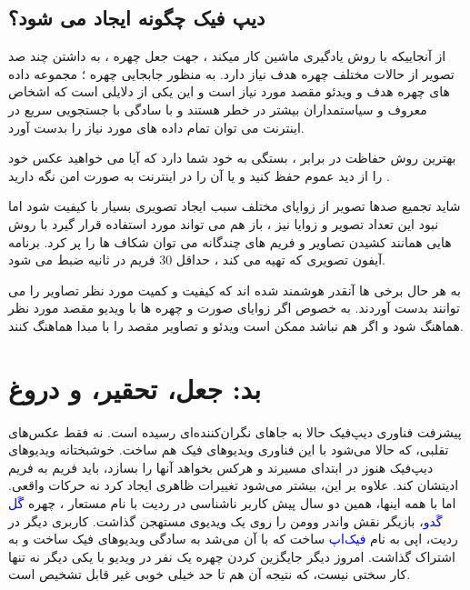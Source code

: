 \documentclass[12pt,a4paper]{report}
\begin{document}
\section{دیپ فیک  چگونه ایجاد می شود؟}
از آنجاییکه  با روش یادگیری ماشین کار میکند ، جهت جعل چهره ،  به داشتن چند صد تصویر از حالات مختلف چهره هدف نیاز دارد. به منظور جابجایی چهره ؛ مجموعه داده های چهره هدف و ویدئو مقصد مورد نیاز است و این یکی از دلایلی است که اشخاص معروف و سیاستمداران بیشتر در خطر هستند و با سادگی با جستجویی سریع در اینترنت می توان تمام داده های مورد نیاز را بدست آورد.

بهترین روش حفاظت در برابر  ، بستگی به خود شما دارد که آیا می خواهید عکس خود را از دید عموم حفظ کنید و یا آن را در اینترنت به صورت امن نگه دارید .

شاید تجمیع صدها تصویر از زوایای مختلف سبب ایجاد تصویری بسیار با کیفیت شود اما نبود این تعداد تصویر و زوایا نیز ، باز هم می تواند مورد استفاده   قرار گیرد با روش هایی همانند کشیدن تصاویر و فریم های چندگانه می توان شکاف ها را پر کرد. برنامه  آیفون تصویری که تهیه می کند ، حداقل 30 فریم در ثانیه ضبط می شود.

به هر حال برخی  ها آنقدر هوشمند شده اند که کیفیت و کمیت مورد نظر تصاویر را می توانند بدست آوردند. به خصوص اگر زوایای صورت و چهره ها با ویدیو مقصد مورد نظر هماهنگ شود و اگر هم نباشد ممکن است ویدئو و تصاویر مقصد را با مبدا هماهنگ کنند.
	
\chapter{بد: جعل، تحقیر، و دروغ}\label{فصل دوم}
 	
 	پیشرفت فناوری دیپ‌فیک حالا به جاهای نگران‌کننده‌ای رسیده است. نه فقط عکس‌های تقلبی، که حالا می‌شود با این فناوری ویدیوهای فیک هم ساخت. خوشبختانه ویدیوهای دیپ‌فیک هنوز در ابتدای مسیرند و هرکس بخواهد آنها را بسازد، باید فریم به فریم ادیتشان کند. علاوه بر این، بیشتر می‌شود تغییرات ظاهری ایجاد کرد نه حرکات واقعی. اما با همه اینها، همین دو سال پیش کاربر ناشناسی در ردیت با نام مستعار \lr{\textcolor{blue}{deepfakes}}، چهره \textcolor{blue}{گَل گَدو}، بازیگر نقش واندر وومن را روی یک ویدیوی مستهجن گذاشت. کاربری دیگر در ردیت، اپی به نام \textcolor{blue}{فیک‌اپ } ساخت که با آن می‌شد به سادگی ویدیوهای فیک ساخت و به اشتراک گذاشت. امروز دیگر جایگزین کردن چهره یک نفر در ویدیو با یکی دیگر نه تنها کار سختی نیست، که نتیجه آن هم تا حد خیلی خوبی غیر قابل تشخیص است.
 	
\end{document}
